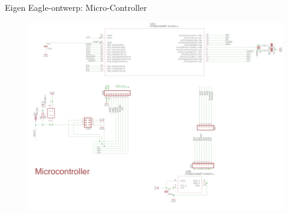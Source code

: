 \documentclass[t,12pt,english
\ifx\beamermode\undefined\else,\beamermode\fi
]{beamer}
\begin{document}
\begin{frame}{Eigen Eagle-ontwerp: Micro-Controller}
\begin{figure}[H]
	\centering
	\includegraphics[width=\textwidth,height=0.8\textheight,keepaspectratio]{eigenschematicdeel3.png}
\end{figure}
\end{frame}
\end{document}
